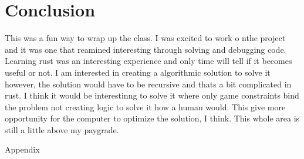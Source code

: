 \documentclass[12pt]{article}
\begin{document}
\section{Conclusion}
This was a fun way to wrap up the class. I was excited to work o nthe project and it was one that reamined interesting through solving and debugging code.
Learning rust was an interesting experience and only time will tell if it becomes useful or not. I am interested in creating a algorithmic solution to solve it
however, the solution would have to be recursive and thats a bit complicated in rust. I think it would be interestinng to solve it where only game constraints bind the problem
not creating logic to solve it how a human would. This give more opportunity for the computer to optimize the solution, I think. This whole area is still a little above my paygrade.
\clearpage
\newpage
\appendix
\begin{Huge} Appendix \end{Huge}
\end{document}

